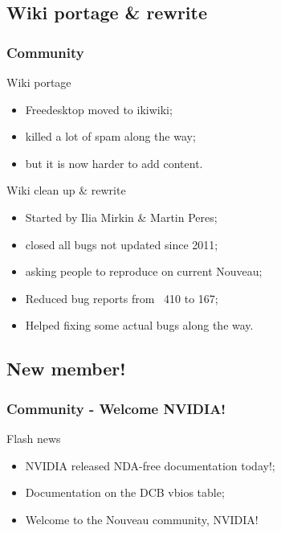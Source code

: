 \documentclass[11pt,english,compress]{beamer}
\begin{document}
\subsection{Wiki portage \& rewrite}
\begin{frame}
	\frametitle{Community}

	\begin{block}{Wiki portage}
		\begin{itemize}
			\item Freedesktop moved to ikiwiki;
			\item killed a lot of spam along the way;
			\item but it is now harder to add content.
		\end{itemize}
	\end{block}

	\begin{block}{Wiki clean up \& rewrite}
		\begin{itemize}
			\item Started by Ilia Mirkin \& Martin Peres;
			\item closed all bugs not updated since 2011;
			\item asking people to reproduce on current Nouveau;
			\item Reduced bug reports from ~410 to 167;
			\item Helped fixing some actual bugs along the way.
		\end{itemize}
	\end{block}
\end{frame}

\subsection{New member!}
\begin{frame}
	\frametitle{Community - Welcome NVIDIA!}

	\begin{block}{Flash news}
		\begin{itemize}
			\item NVIDIA released NDA-free documentation today!;
			\item Documentation on the DCB vbios table;
			\item Welcome to the Nouveau community, NVIDIA!
		\end{itemize}
	\end{block}
\end{frame}
\end{document}
